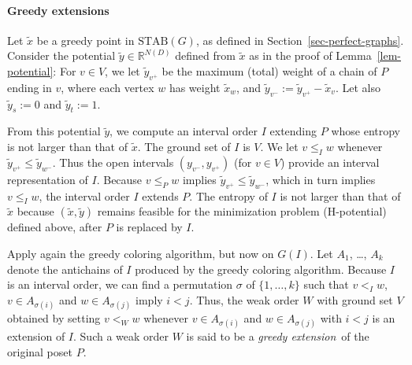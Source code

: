 \documentclass[12pt,oneside]{article}
\newcommand{\STAB}{\mathrm{STAB}}
\begin{document}
\paragraph{Greedy extensions}
Let $\tilde x$ be a greedy point in $\STAB(G)$, as defined in Section~\ref{sec-perfect-graphs}. Consider the potential $\tilde y\in \mathbb{R}^{N(D)}$ defined from $\tilde x$ as in the proof of Lemma~\ref{lem-potential}: For $v\in V$, we let $\tilde y_{v^{+}}$ be the maximum (total) weight of a chain of $P$ ending in $v$, where each vertex $w$ has weight $\tilde x_{w}$, and $\tilde y_{v^{-}} := \tilde y_{v^{+}} - \tilde x_{v}$. Let also $\tilde y_{s} :=0$ and $\tilde y_{t} :=1$.

From this potential $\tilde y$, we compute an interval order $I$ extending $P$ whose entropy is not larger than that of $\tilde x$. The ground set of $I$ is $V$. We let $v \leqslant_I w$ whenever $\tilde{y}_{v^+} \le \tilde{y}_{w^-}$. Thus the open intervals $(y_{v^-},y_{v^+})$ (for $v \in V$) provide an interval representation of $I$. Because $v \leqslant_P w$ implies $\tilde{y}_{v^+} \le \tilde{y}_{w^-}$, which in turn implies $v \leqslant_I w$, the interval order $I$ extends $P$.  The entropy of $I$ is not larger than that of $\tilde x$ because $(\tilde x,\tilde y)$ remains feasible for the minimization problem (H-potential) defined above, after  $P$ is replaced by $I$.

Apply again the greedy coloring algorithm, but now on $G(I)$. Let $A_1$, \ldots, $A_k$ denote the antichains of $I$ produced by the greedy coloring algorithm. Because $I$ is an interval order, we can find a permutation $\sigma$ of $\{1,\ldots,k\}$ such that $v <_I w$, $v \in A_{\sigma(i)}$ and $w \in A_{\sigma(j)}$ imply $i < j$. Thus, the weak order $W$ with ground set $V$ obtained by setting $v <_W w$ whenever $v \in A_{\sigma(i)}$ and $w \in A_{\sigma(j)}$ with $i < j$ is an extension of $I$. Such a weak order $W$ is said to be a {\em greedy extension\,} of the original poset $P$.
\end{document}
